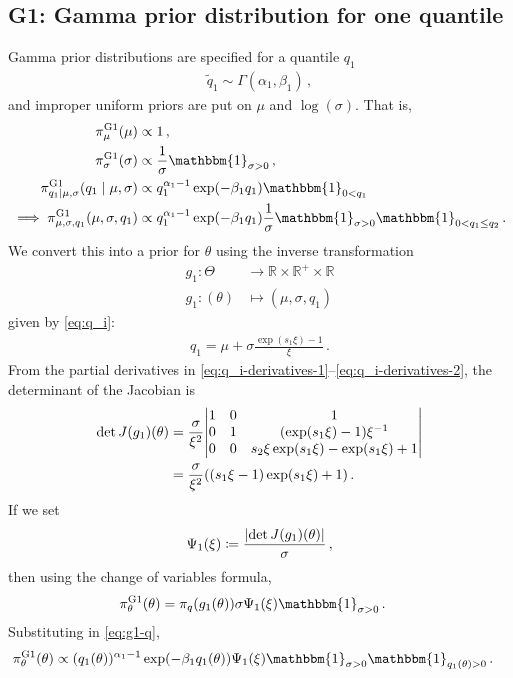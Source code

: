 \documentclass{article}
\DeclarePairedDelimiter\abs{\lvert}{\rvert}
\newcommand{\R}{\mathbb{R}}
\begin{document}
\subsection{G1: Gamma prior distribution for one quantile}
\label{section:prior-g1}
%
Gamma prior distributions are specified for a quantile
$q_1$
%
\begin{align*}
	\tilde{q}_1 \sim \Gamma(\alpha_1, \beta_1) \,,
\end{align*}
%
and improper uniform priors are put on $\mu$ and $\log(\sigma)$. That is,
%
\begin{align}
	\pi^{\text{G1}}_{\mu}(\mu)
		&\propto 1 \,, \nonumber \\
	\pi^{\text{G1}}_{\sigma}(\sigma)
		&\propto \frac{1}{\sigma} \mathbbm{1}_{\sigma > 0} \,, \nonumber \\
	\pi^{\text{G1}}_{q_1 \mid \mu, \sigma}(q_{1} \mid \mu, \sigma)
		&\propto q_{1} ^ {\alpha_1 - 1} \exp(-\beta_1 q_{1})
		\mathbbm{1}_{0 < q_1}\nonumber \\
	\implies \pi^{\text{G1}}_{\mu, \sigma, q_1}(\mu, \sigma, q_1)
		&\propto q_{1} ^ {\alpha_1 - 1} \exp(-\beta_1 q_{1})
		\frac{1}{\sigma} \mathbbm{1}_{\sigma > 0}
		\mathbbm{1}_{0 < q_1 \leq q_2} \,.
	\label{eq:g1-q}
\end{align}
%
We convert this into a prior for $\theta$
using the inverse transformation
%
\begin{align*}
	g_1 \colon \Theta &\to \R \times \R^+ \times \R \\
	g_1 \colon (\theta) &\mapsto (\mu, \sigma, q_{1})
\end{align*}
%
given by \eqref{eq:q_i}:
%
\begin{align*}
	q_1 = \mu + \sigma \frac{\exp(s_1 \xi) - 1}{\xi} \,.
\end{align*}
%
From the partial derivatives in
\eqref{eq:q_i-derivatives-1}--\eqref{eq:q_i-derivatives-2},
the determinant of the Jacobian is
%
\begin{align*}
	\det J(g_1)(\theta)
	&= \frac{\sigma}{\xi ^ 2} \abs*{
			\begin{matrix}
			1 &0 &1 \\
			0 &1 &(\exp(s_1 \xi) - 1)\xi^{-1}  \\
			0 &0 &s_2 \xi \exp(s_1 \xi) -\exp(s_1 \xi) + 1 \\
			\end{matrix} } \\
	&= \frac{\sigma}{\xi ^ 2} ((s_1 \xi - 1)\exp(s_1 \xi) + 1) \,.
\end{align*}
%
If we set
\begin{align*}
	\Psi_1(\xi) \coloneqq \frac{\abs{\det J(g_1)(\theta)}}{\sigma} \,,
\end{align*}
%
then using the change of variables formula,
%
\begin{align*}
	\pi^{\text{G1}}_\theta(\theta)
		&= \pi_q(g_1(\theta)) \sigma \Psi_1(\xi)
		\mathbbm{1}_{\sigma>0} \,.
\end{align*}
%
Substituting in \eqref{eq:g1-q},
%
\begin{align*}
	\pi^{\text{G1}}_\theta(\theta)
		&\propto (q_{1}(\theta)) ^ {\alpha_1 - 1} \exp(-\beta_1 q_{1}(\theta))
		\Psi_1(\xi) \mathbbm{1}_{\sigma > 0}
		\mathbbm{1}_{q_1(\theta) > 0} \,.
\end{align*}
%
\end{document}

